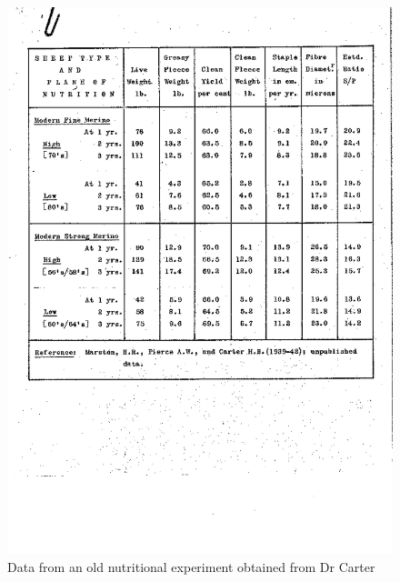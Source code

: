 %

\begin{figure}[h]
  \centering
   \includegraphics[width=1.1\textwidth]{carterup1.png}
  \caption{Data from an old nutritional experiment obtained from Dr Carter}
  \label{fig:carterup1}
\end{figure}

%

